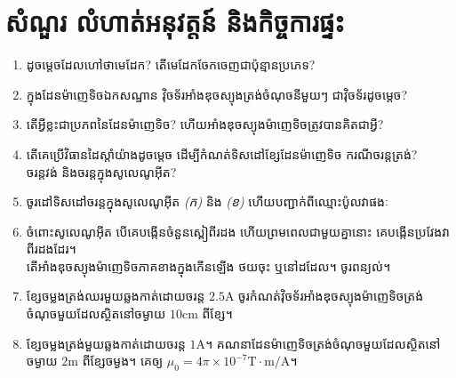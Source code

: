 \section{សំណួរ លំហាត់អនុវត្តន៍ និងកិច្ចការផ្ទះ}
\begin{enumerate}
	\item ដូចម្តេចដែលហៅថាមេដែក? តើមេដែកចែកចេញជាប៉ុន្មានប្រភេទ?
	\item ក្នុងដែនម៉ាញេទិចឯកសណ្ឋាន វ៉ិចទ័រអាំងឌុចស្យុងត្រង់ចំណុចនីមួយៗ ជាវ៉ិចទ័រដូចម្តេច?
	\item តើអ្វីខ្លះជាប្រភពនៃដែនម៉ាញេទិច? ហើយអាំងឌុចស្យុងម៉ាញេទិចត្រូវបានគិតជាអ្វី?
	\item តើគេប្រើវិធានដៃស្តាំយ៉ាងដូចម្តេច ដើម្បីកំណត់ទិសដៅខ្សែដែនម៉ាញេទិច ករណីចរន្តត្រង់? \\ចរន្តវង់ និងចរន្តក្នុងសូលេណូអ៊ីត?
	\item ចូរដៅទិសដៅចរន្តក្នុងសូលេណូអ៊ីត \emph{\kml(ក)} និង \emph{\kml(ខ)} ហើយបញ្ជាក់ពីឈ្មោះប៉ូលវាផងៈ
	\begin{figure}[H]
		\begin{subfigure}{.5\textwidth}
			\centering
			\caption{}
		\end{subfigure}
		\begin{subfigure}{.5\textwidth}
			\centering
			\caption{}
		\end{subfigure}
	\end{figure}
	\item ចំពោះសូលេណូអ៊ីត បើគេបង្កើនចំនួនស្ពៀពីរដង ហើយព្រមពេលជាមួយគ្នានោះ គេបង្កើនប្រវែងវាពីរដងដែរ។\\ តើអាំងឌុចស្យុងម៉ាញេទិចភាគខាងក្នុងកើនឡើង ថយចុះ ឬនៅដដែល។ ចូរពន្យល់។
	\item ខ្សែចម្លងត្រង់ឈរមួយឆ្លងកាត់ដោយចរន្ត $2.5\si{\ampere}$ ចូរកំណត់វ៉ិចទ័រអាំងឌុចស្យុងម៉ាញេទិចត្រង់ចំណុចមួយដែលស្ថិតនៅចម្ងាយ $10\si{\centi\metre}$ ពីខ្សែ។
	\item ខ្សែចម្លងត្រង់មួយឆ្លងកាត់ដោយចរន្ត $1\si{\ampere}$។ គណនាដែនម៉ាញេទិចត្រង់ចំណុចមួយដែលស្ថិតនៅចម្ងាយ $2\si{\metre}$ ពីខ្សែចម្ងង។ គេឲ្យ $\mu_{0}=4\pi\times10^{-7}\si{\tesla}\cdot\si{\metre/\ampere}$។

\end{enumerate}
